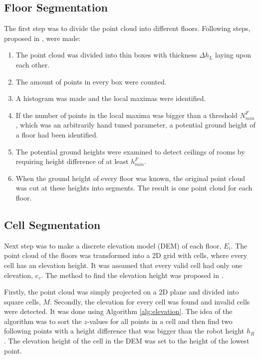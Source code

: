 \subsection{Floor Segmentation}
The first step was to divide the point cloud into different floors. Following steps, proposed in \cite{terrainassessment}, were made:
\begin{enumerate}
    \item The point cloud was divided into thin boxes with thickness $\Delta h_{L}$ laying upon each other.
    \item The amount of points in every box were counted.
    \item A histogram was made and the local maximas were identified.
    \item If the number of points in the local maxima was bigger than a threshold $N^{F}_{min}$, which was an arbitrarily hand tuned parameter, a potential ground height of a floor had been identified.
    \item The potential ground heights were examined to detect ceilings of rooms by requiring height difference of at least $h^{F}_{min}$.  
    \item When the ground height of every floor was known, the original point cloud was cut at these heights into segments. The result is one point cloud for each floor.
\end{enumerate}

\subsection{Cell Segmentation}
Next step was to make a discrete elevation model (DEM) of each floor, $E_i$. The point cloud of the floors was transformed into a 2D grid with cells, where every cell has an elevation height. It was assumed that every valid cell had only one elevation, $e_c$. The method to find the elevation height was proposed in \cite{terrainassessment}.

Firstly, the point cloud was simply projected on a 2D plane and divided into square cells, $M$. Secondly, the elevation for every cell was found and invalid cells were detected. It was done using Algorithm \ref{alg:elevation}. The idea of the algorithm was to sort the $z$-values for all points in a cell and then find two following points with a height difference that was bigger than the robot height $h_R$. The elevation height of the cell in the DEM was set to the height of the lowest point.

